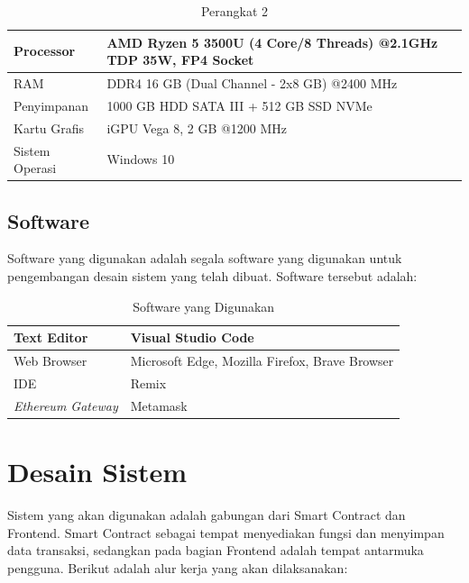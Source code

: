 \begin{table}[htp] 
\caption{Perangkat 2}
\centering
\begin{tabular}
{|p{4cm}|p{9cm}|}
\hline
Processor & AMD Ryzen 5 3500U (4 Core/8 Threads) @2.1GHz TDP 35W, FP4 Socket \\ \hline
RAM & DDR4 16 GB (Dual Channel - 2x8 GB) @2400 MHz \\ \hline
Penyimpanan & 1000 GB HDD SATA III + 512 GB SSD NVMe \\ \hline
Kartu Grafis & iGPU Vega 8, 2 GB @1200 MHz \\ \hline
Sistem Operasi & Windows 10 \\ \hline 
\end{tabular}
\end{table}

\subsection{Software}
\label{subsec:software}

Software yang digunakan adalah segala software yang digunakan untuk pengembangan desain sistem yang telah dibuat. Software tersebut adalah:

\begin{table}[htp] 
\caption{Software yang Digunakan}
\centering
\begin{tabular}
{|p{4cm}|p{6cm}|}
\hline
Text Editor & Visual Studio Code \\ \hline
Web Browser & Microsoft Edge, Mozilla Firefox, Brave Browser \\ \hline
IDE & Remix \\ \hline
\emph{Ethereum Gateway} & Metamask \\ \hline
\end{tabular}
\end{table}



\section{Desain Sistem}
\label{sec:desainsistem}

Sistem yang akan digunakan adalah gabungan dari Smart Contract dan Frontend. Smart Contract sebagai tempat menyediakan fungsi dan menyimpan data transaksi, sedangkan pada bagian Frontend adalah tempat antarmuka pengguna. Berikut adalah alur kerja yang akan dilaksanakan:

